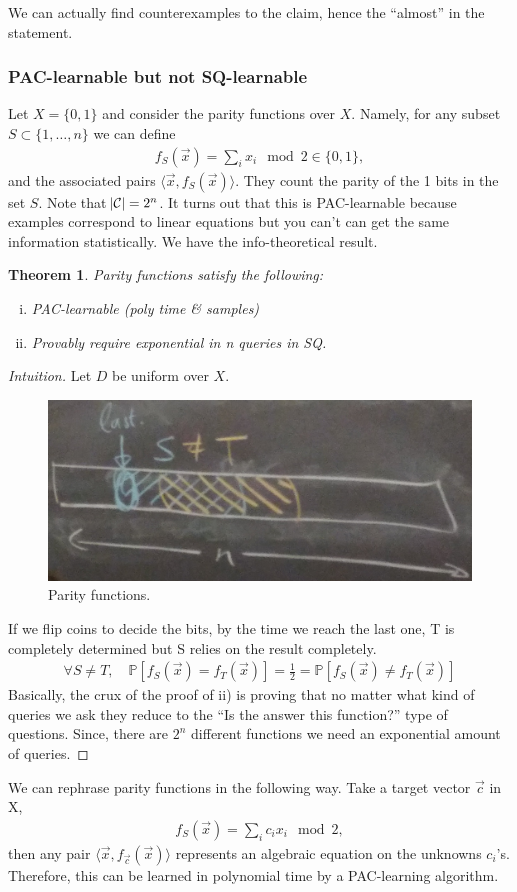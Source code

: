 \documentclass[12pt, letterpaper]{article}
\numberwithin{equation}{section} %
\newcommand{\mb}{\mathbb}
\newcommand{\mc}{\mathcal}
\newtheorem{theorem}{Theorem}[section]
\theoremstyle{definition}
\theoremstyle{remark}
\begin{document}
We can actually find counterexamples to the claim, hence the ``almost'' in the statement.
\subsubsection{PAC-learnable but not SQ-learnable}
Let $X=\lbrace 0,1 \rbrace$ and consider the parity functions over $X$. Namely, for any subset $S\subset \lbrace 1,\ldots, n\rbrace$ we can define
\begin{align}
f_S(\vec x) = \sum_ix_i \mod 2 \in \lbrace 0, 1\rbrace,
\end{align}
and the associated pairs $\langle \vec x, f_S(\vec x)\rangle$. They count the parity of the 1 bits in the set $S$. Note that $\abs{\mc C} = 2^n$. It turns out that this is PAC-learnable because examples correspond to linear equations but you can't can get the same information statistically. We have the info-theoretical result.
\begin{theorem}
Parity functions satisfy the following:
\begin{enumerate}[i)]
\item PAC-learnable (poly time \& samples)
\item Provably require exponential in n queries in SQ.
\end{enumerate}
\end{theorem}
\begin{proof}[Intuition]
Let $D$ be uniform over $X$.
\begin{figure}[H]
\centering
\includegraphics[width=0.6\linewidth]{img/parity.jpg}
\caption{Parity functions.}
\end{figure}
If we flip coins to decide the bits, by the time we reach the last one, T is completely determined but S relies on the result completely. 
\begin{align}
\forall S\ne T,\quad\mb P[f_S(\vec x) = f_T(\vec x)] = \frac 12 = \mb P[f_S(\vec x) \ne f_T(\vec x)]
\end{align}
Basically, the crux of the proof of ii) is proving that no matter what kind of queries we ask they reduce to the ``Is the answer this function?'' type of questions. Since, there are $2^n$ different functions we need an exponential amount of queries.
\end{proof}
We can rephrase parity functions in the following way. Take a target vector $\vec c$ in X,
\begin{align}
f_S(\vec x) = \sum_ic_ix_i \mod 2,
\end{align}
then any pair  $\langle \vec x, f_{\vec c}(\vec x)\rangle$ represents an algebraic equation on the unknowns $c_i$'s. Therefore, this can be learned in polynomial time by a PAC-learning algorithm.
\end{document}
